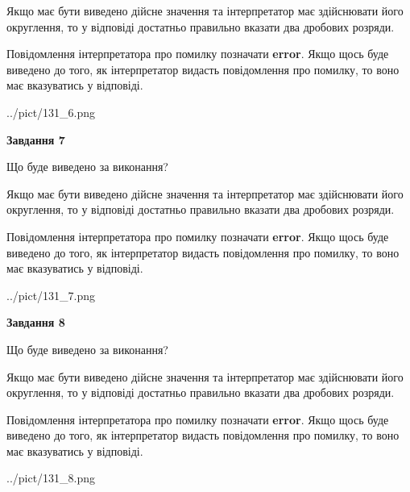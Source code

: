 \documentclass[12pt, ukrainian]{article}
\begin{document}
{\begin {Large}
Якщо має бути виведено дійсне значення та інтерпретатор має здійснювати його округлення, 
то у відповіді достатньо правильно вказати два дробових розряди.

Повідомлення інтерпретатора про помилку позначати \textbf{error}.
Якщо щось буде виведено до того, як інтерпретатор видасть повідомлення про помилку, 
то воно має вказуватись у відповіді. \par

\begin{center}
	{../pict/131_6.png}
\end{center}
\newpage

{\begin {center}\textbf{Завдання 7}\end {center}}\par
Що буде виведено за виконання? \par

Якщо має бути виведено дійсне значення та інтерпретатор має здійснювати його округлення, 
то у відповіді достатньо правильно вказати два дробових розряди.

Повідомлення інтерпретатора про помилку позначати \textbf{error}.
Якщо щось буде виведено до того, як інтерпретатор видасть повідомлення про помилку, 
то воно має вказуватись у відповіді. \par

\begin{center}
	{../pict/131_7.png}
\end{center}
\newpage

{\begin {center}\textbf{Завдання 8}\end {center}}\par
Що буде виведено за виконання? \par

Якщо має бути виведено дійсне значення та інтерпретатор має здійснювати його округлення, 
то у відповіді достатньо правильно вказати два дробових розряди.

Повідомлення інтерпретатора про помилку позначати \textbf{error}.
Якщо щось буде виведено до того, як інтерпретатор видасть повідомлення про помилку, 
то воно має вказуватись у відповіді. \par

\begin{center}
	{../pict/131_8.png}
\end{center}
\newpage


\end{Large}}
\end{document}
